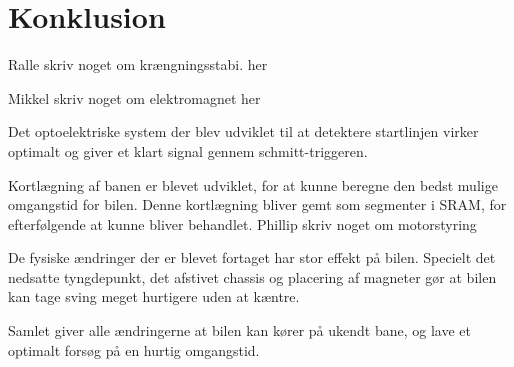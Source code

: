 

\section{Konklusion}
Ralle skriv noget om krængningsstabi. her

Mikkel skriv noget om elektromagnet her


Det optoelektriske system der blev udviklet til at detektere startlinjen virker
optimalt og giver et klart signal gennem schmitt-triggeren.


Kortlægning af banen er blevet udviklet, for at kunne beregne den bedst mulige omgangstid for bilen.
Denne kortlægning bliver gemt som segmenter i SRAM, for efterfølgende at kunne bliver behandlet.
Phillip skriv noget om motorstyring

De fysiske ændringer der er blevet fortaget har stor effekt på bilen. Specielt det nedsatte tyngdepunkt, det afstivet chassis og placering af magneter gør at bilen kan tage sving meget hurtigere uden at kæntre.

Samlet giver alle ændringerne at bilen kan kører på ukendt bane, og lave et optimalt forsøg på en hurtig omgangstid.
